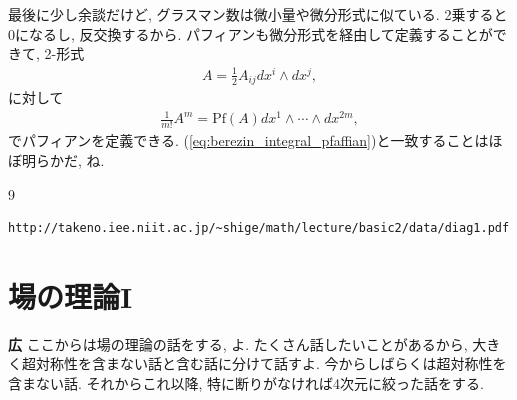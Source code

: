\documentclass{ltjsarticle}
\theoremstyle{definition}
\begin{document}
最後に少し余談だけど, グラスマン数は微小量や微分形式に似ている. 2乗すると0になるし, 反交換するから. パフィアンも微分形式を経由して定義することができて, 2-形式
\begin{gather}
  A=\frac12A_{ij}dx^i\wedge dx^j,
\end{gather}
に対して
\begin{gather}
  \frac1{m!}A^m=\mathrm{Pf}(A)dx^1\wedge\cdots\wedge dx^{2m},
\end{gather}
でパフィアンを定義できる. (\ref{eq:berezin_integral_pfaffian})と一致することはほぼ明らかだ, ね.
\begin{thebibliography}{9}
  \bibitem{} 
  \begin{verbatim}
http://takeno.iee.niit.ac.jp/~shige/math/lecture/basic2/data/diag1.pdf
  \end{verbatim}
\end{thebibliography}

\section{場の理論I}
\noindent
\textbf{広} ここからは場の理論の話をする, よ. たくさん話したいことがあるから, 大きく超対称性を含まない話と含む話に分けて話すよ. 今からしばらくは超対称性を含まない話. それからこれ以降, 特に断りがなければ4次元に絞った話をする.
\end{document}
